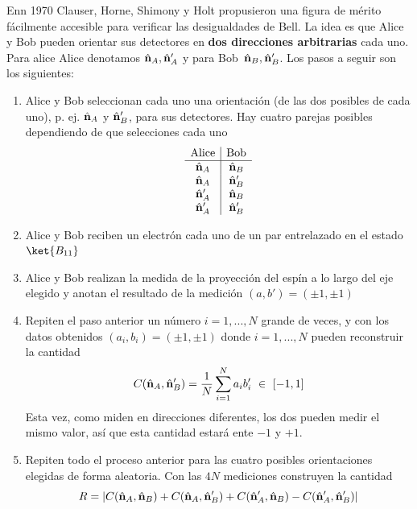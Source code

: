 \documentclass[a4paper,11pt]{book} %
\numberwithin{equation}{chapter}
\begin{document}
Enn 1970 Clauser, Horne, Shimony y Holt \cite{bib_Bell_CHSH} propusieron una figura de mérito fácilmente accesible para verificar las desigualdades de Bell. La idea es que Alice y Bob pueden orientar sus detectores en \textbf{dos direcciones  arbitrarias} cada uno. Para alice Alice denotamos $\hat{\bf n}_A, \hat{\bf n}'_A$  y  para Bob $\, \hat{\bf n}_B, \hat{\bf n}'_B$. Los pasos a seguir son los siguientes:
\begin{enumerate}
	\item Alice y Bob seleccionan cada uno una orientación (de las dos posibles de cada uno), p. ej.  $\hat{\bf n}_A$ y $\hat{\bf n}'_B$, para sus detectores. 
	Hay cuatro parejas posibles dependiendo de que selecciones cada uno
	$$
	\begin{array}{c|c} {\rm Alice} & {\rm Bob} \\ 
	\hline \hat{\bf n}_A  &  \hat{\bf n}_B     \\ 
	\hat{\bf n}_A         &  \hat{\bf n}'_B    \\ 
	\hat{\bf n}'_A        &  \hat{\bf n}_B     \\ 
	\hat{\bf n}'_A        &  \hat{\bf n}'_B \end{array}
	$$

	\item Alice y Bob reciben un electrón cada uno de un par entrelazado en el estado $\ket{B_{11}}$

	\item Alice y Bob realizan la medida de la proyección del espín a lo largo del eje elegido y anotan el resultado de la medición $(a,b')=(\pm 1, \pm 1)$
	
	\item Repiten el paso anterior un número $i=1,..., N$ grande de veces, y con los datos obtenidos $(a_i,b_i)=(\pm 1, \pm 1)$
donde $i=1,...,N$ pueden reconstruir la cantidad
	$$
	 C(\hat{\bf n}_A, \hat{\bf n}'_B) = \frac{1}{N}\sum_{i=1}^N a_i b'_i ~\in~  [-1,1]
	$$
Esta vez, como miden en direcciones diferentes, los dos pueden medir el mismo valor, así que esta cantidad estará ente $-1$ y $+1$.

	\item Repiten todo el proceso anterior para las cuatro posibles orientaciones elegidas de forma aleatoria. Con las  $4N$ mediciones construyen la cantidad
	\begin{equation} \label{ec_entrelazamiento_bell_R}
	R = | C(\hat{\bf n}_A, \hat{\bf n}_B) +  C(\hat{\bf n}_A, \hat{\bf n}'_B) +  C(\hat{\bf n}'_A, \hat{\bf n}_B)-  
	C(\hat{\bf n}'_A, \hat{\bf n}'_B)|
	\end{equation}

\end{enumerate}
\end{document}
